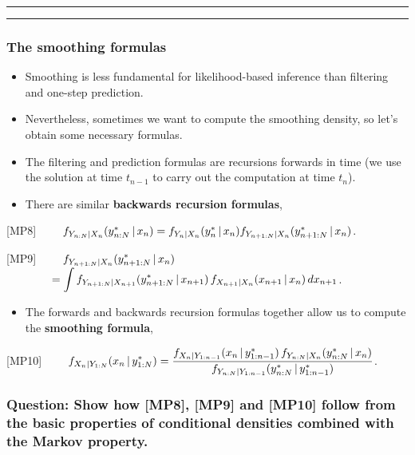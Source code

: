 \documentclass[]{article}
\providecommand{\tightlist}{%
  \setlength{\itemsep}{0pt}\setlength{\parskip}{0pt}}
\begin{document}
\begin{center}\rule{0.5\linewidth}{\linethickness}\end{center}

\begin{center}\rule{0.5\linewidth}{\linethickness}\end{center}

\subsubsection{The smoothing formulas}\label{the-smoothing-formulas}

\begin{itemize}
\item
  Smoothing is less fundamental for likelihood-based inference than
  filtering and one-step prediction.
\item
  Nevertheless, sometimes we want to compute the smoothing density, so
  let's obtain some necessary formulas.
\item
  The filtering and prediction formulas are recursions forwards in time
  (we use the solution at time \(t_{n-1}\) to carry out the computation
  at time \(t_{n}\)).
\item
  There are similar \textbf{backwards recursion formulas},
\end{itemize}

{[}MP8{]}
\(\quad\quad f_{Y_{n:N}|X_{n}}(y_{n:N}^*{\, | \,} x_n)= f_{Y_n|X_n}(y_n^*{\, | \,} x_n) f_{Y_{n+1:N}|X_{n}}(y_{n+1:N}^*{\, | \,} x_n)\).

{[}MP9{]}
\(\quad\quad \displaystyle f_{Y_{n+1:N}|X_{n}}(y_{n+1:N}^*{\, | \,} x_n)\)
\(\quad\quad\quad\quad\displaystyle = \int f_{Y_{n+1:N}|X_{n+1}}(y_{n+1:N}^*{\, | \,} x_{n+1}) \, f_{X_{n+1}|X_n}(x_{n+1}{\, | \,} x_n)\, dx_{n+1}\).

\begin{itemize}
\tightlist
\item
  The forwards and backwards recursion formulas together allow us to
  compute the \textbf{smoothing formula},
\end{itemize}

{[}MP10{]}
\(\quad\quad \displaystyle  f_{X_{n}|Y_{1:N}}(x_n{\, | \,} y_{1:N}^*) = \frac{ f_{X_{n}|Y_{1:n-1}}(x_{n}{\, | \,} y_{1:n-1}^*) \, f_{Y_{n:N}|X_{n}}(y_{n:N}^*{\, | \,} x_n) }{ f_{Y_{n:N}|Y_{1:n-1}}(y_{n:N}^*{\, | \,} y_{1:n-1}^*) }\).

\subsubsection{Question: Show how {[}MP8{]}, {[}MP9{]} and {[}MP10{]}
follow from the basic properties of conditional densities combined with
the Markov
property.}\label{question-show-how-mp8-mp9-and-mp10-follow-from-the-basic-properties-of-conditional-densities-combined-with-the-markov-property.}
\end{document}
